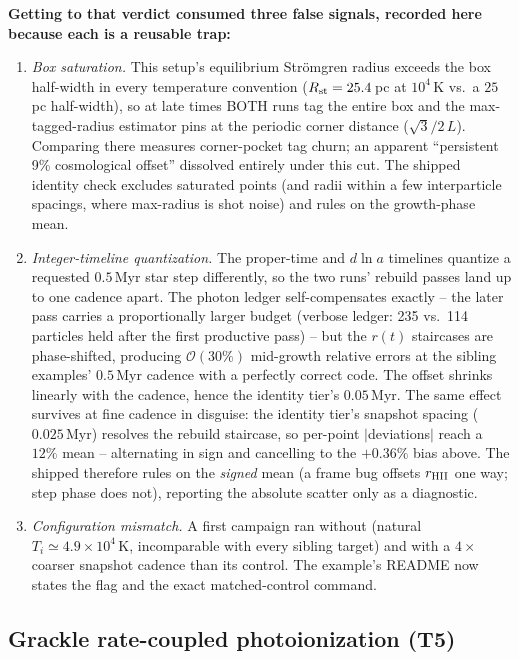 \textbf{Getting to that verdict consumed three false signals, recorded
here because each is a reusable trap:}
\begin{enumerate}
\item \emph{Box saturation.} This setup's equilibrium Str\"omgren
  radius exceeds the box half-width in every temperature convention
  ($R_{\rm st}=25.4\,$pc at $10^4\,$K vs.\ a $25\,$pc half-width), so
  at late times BOTH runs tag the entire box and the max-tagged-radius
  estimator pins at the periodic corner distance ($\sqrt3/2\,L$).
  Comparing there measures corner-pocket tag churn; an apparent
  ``persistent 9\% cosmological offset'' dissolved entirely under this
  cut. The shipped identity check excludes saturated points (and radii
  within a few interparticle spacings, where max-radius is shot noise)
  and rules on the growth-phase mean.
\item \emph{Integer-timeline quantization.} The proper-time and
  $d\ln a$ timelines quantize a requested $0.5\,$Myr star step
  differently, so the two runs' rebuild passes land up to one cadence
  apart. The photon ledger self-compensates exactly -- the later pass
  carries a proportionally larger budget (verbose ledger: 235 vs.\ 114
  particles held after the first productive pass) -- but the $r(t)$
  staircases are phase-shifted, producing $\mathcal{O}(30\%)$
  mid-growth relative errors at the sibling examples' $0.5\,$Myr
  cadence with a perfectly correct code. The offset shrinks linearly
  with the cadence, hence the identity tier's $0.05\,$Myr. The same
  effect survives at fine cadence in disguise: the identity tier's
  snapshot spacing ($0.025\,$Myr) resolves the rebuild staircase, so
  per-point $|$deviations$|$ reach a $12\%$ mean -- alternating in sign
  and cancelling to the $+0.36\%$ bias above. The shipped
   therefore rules on the \emph{signed}
  mean (a frame bug offsets $r_{\rm HII}$ one way; step phase does
  not), reporting the absolute scatter only as a diagnostic.
\item \emph{Configuration mismatch.} A first campaign ran without
  (natural $T_i\simeq4.9\times10^4\,$K, incomparable with every sibling
  target) and with a $4\times$ coarser snapshot cadence than its
  control. The example's README now states the flag and the exact
  matched-control command.
\end{enumerate}

\subsection{Grackle rate-coupled photoionization (T5)}
\label{sec:t5-validation}

